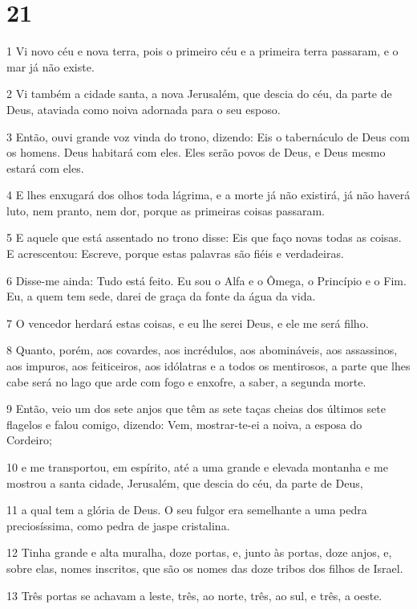 \chapter{21}

\par 1 Vi novo céu e nova terra, pois o primeiro céu e a primeira terra passaram, e o mar já não existe.
\par 2 Vi também a cidade santa, a nova Jerusalém, que descia do céu, da parte de Deus, ataviada como noiva adornada para o seu esposo.
\par 3 Então, ouvi grande voz vinda do trono, dizendo: Eis o tabernáculo de Deus com os homens. Deus habitará com eles. Eles serão povos de Deus, e Deus mesmo estará com eles.
\par 4 E lhes enxugará dos olhos toda lágrima, e a morte já não existirá, já não haverá luto, nem pranto, nem dor, porque as primeiras coisas passaram.
\par 5 E aquele que está assentado no trono disse: Eis que faço novas todas as coisas. E acrescentou: Escreve, porque estas palavras são fiéis e verdadeiras.
\par 6 Disse-me ainda: Tudo está feito. Eu sou o Alfa e o Ômega, o Princípio e o Fim. Eu, a quem tem sede, darei de graça da fonte da água da vida.
\par 7 O vencedor herdará estas coisas, e eu lhe serei Deus, e ele me será filho.
\par 8 Quanto, porém, aos covardes, aos incrédulos, aos abomináveis, aos assassinos, aos impuros, aos feiticeiros, aos idólatras e a todos os mentirosos, a parte que lhes cabe será no lago que arde com fogo e enxofre, a saber, a segunda morte.
\par 9 Então, veio um dos sete anjos que têm as sete taças cheias dos últimos sete flagelos e falou comigo, dizendo: Vem, mostrar-te-ei a noiva, a esposa do Cordeiro;
\par 10 e me transportou, em espírito, até a uma grande e elevada montanha e me mostrou a santa cidade, Jerusalém, que descia do céu, da parte de Deus,
\par 11 a qual tem a glória de Deus. O seu fulgor era semelhante a uma pedra preciosíssima, como pedra de jaspe cristalina.
\par 12 Tinha grande e alta muralha, doze portas, e, junto às portas, doze anjos, e, sobre elas, nomes inscritos, que são os nomes das doze tribos dos filhos de Israel.
\par 13 Três portas se achavam a leste, três, ao norte, três, ao sul, e três, a oeste.
